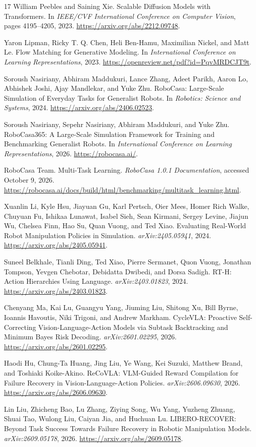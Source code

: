 \begin{thebibliography}{17}
William Peebles and Saining Xie.
Scalable Diffusion Models with Transformers.
In \emph{IEEE/CVF International Conference on Computer Vision}, pages 4195--4205, 2023.
\url{https://arxiv.org/abs/2212.09748}.

Yaron Lipman, Ricky T. Q. Chen, Heli Ben-Hamu, Maximilian Nickel, and Matt Le.
Flow Matching for Generative Modeling.
In \emph{International Conference on Learning Representations}, 2023.
\url{https://openreview.net/pdf?id=PqvMRDCJT9t}.

Soroush Nasiriany, Abhiram Maddukuri, Lance Zhang, Adeet Parikh, Aaron Lo, Abhishek Joshi, Ajay Mandlekar, and Yuke Zhu.
RoboCasa: Large-Scale Simulation of Everyday Tasks for Generalist Robots.
In \emph{Robotics: Science and Systems}, 2024.
\url{https://arxiv.org/abs/2406.02523}.

Soroush Nasiriany, Sepehr Nasiriany, Abhiram Maddukuri, and Yuke Zhu.
RoboCasa365: A Large-Scale Simulation Framework for Training and Benchmarking Generalist Robots.
In \emph{International Conference on Learning Representations}, 2026.
\url{https://robocasa.ai/}.

RoboCasa Team.
Multi-Task Learning.
\emph{RoboCasa 1.0.1 Documentation}, accessed October 9, 2026.
\url{https://robocasa.ai/docs/build/html/benchmarking/multitask_learning.html}.

Xuanlin Li, Kyle Hsu, Jiayuan Gu, Karl Pertsch, Oier Mees, Homer Rich Walke, Chuyuan Fu, Ishikaa Lunawat, Isabel Sieh, Sean Kirmani, Sergey Levine, Jiajun Wu, Chelsea Finn, Hao Su, Quan Vuong, and Ted Xiao.
Evaluating Real-World Robot Manipulation Policies in Simulation.
\emph{arXiv:2405.05941}, 2024.
\url{https://arxiv.org/abs/2405.05941}.

Suneel Belkhale, Tianli Ding, Ted Xiao, Pierre Sermanet, Quon Vuong, Jonathan Tompson, Yevgen Chebotar, Debidatta Dwibedi, and Dorsa Sadigh.
RT-H: Action Hierarchies Using Language.
\emph{arXiv:2403.01823}, 2024.
\url{https://arxiv.org/abs/2403.01823}.

Chenyang Ma, Kai Lu, Guangyu Yang, Jiuming Liu, Shitong Xu, Bill Byrne, Ioannis Havoutis, Niki Trigoni, and Andrew Markham.
CycleVLA: Proactive Self-Correcting Vision-Language-Action Models via Subtask Backtracking and Minimum Bayes Risk Decoding.
\emph{arXiv:2601.02295}, 2026.
\url{https://arxiv.org/abs/2601.02295}.

Haodi Hu, Chung-Ta Huang, Jing Liu, Ye Wang, Kei Suzuki, Matthew Brand, and Toshiaki Koike-Akino.
ReCoVLA: VLM-Guided Reward Compilation for Failure Recovery in Vision-Language-Action Policies.
\emph{arXiv:2606.09630}, 2026.
\url{https://arxiv.org/abs/2606.09630}.

Lin Liu, Zhicheng Bao, Lu Zhang, Ziying Song, Wu Yang, Yuzheng Zhuang, Shuai Tao, Wulong Liu, Caiyan Jia, and Huchuan Lu.
LIBERO-RECOVER: Beyond Task Success Towards Failure Recovery in Robotic Manipulation Models.
\emph{arXiv:2609.05178}, 2026.
\url{https://arxiv.org/abs/2609.05178}.

\end{thebibliography}
